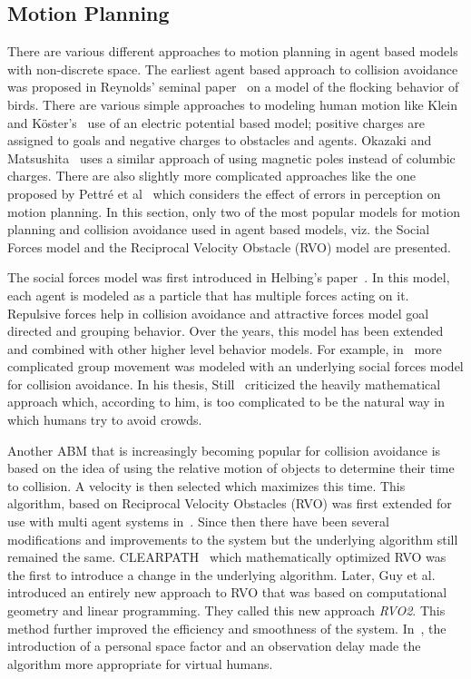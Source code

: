 \documentclass[runningheads,a4paper]{llncs}
\begin{document}
\subsection{Motion Planning}

There are various different approaches to motion planning in agent based models with non-discrete space. The earliest agent based approach to collision avoidance was proposed in Reynolds' seminal paper~\cite{Reynolds:1987vm} on a model of the flocking behavior of birds. There are various simple approaches to modeling human motion like Klein and K\"oster's~\cite{Klein:2009} use of an electric potential based model; positive charges are assigned to goals and negative charges to obstacles and agents. Okazaki and Matsushita~\cite{Okazaki:1993wh} uses a similar approach of using magnetic poles instead of columbic charges. There are also slightly more complicated approaches like the one proposed by Pettr\'e et al~\cite{Pettre:2009fya} which considers the effect of errors in perception on motion planning. In this section, only two of the most popular models for motion planning and collision avoidance used in agent based models, viz. the Social Forces model and the Reciprocal Velocity Obstacle (RVO) model are presented.

The social forces model was first introduced in Helbing's paper~\cite{Helbing:1995ie}. In this model, each agent is modeled as a particle that has multiple forces acting on it. Repulsive forces help in collision avoidance and attractive forces model goal directed and grouping behavior. Over the years, this model has been extended and combined with other higher level behavior models. For example, in~\cite{Kamphuis:2004uu} more complicated group movement was modeled with an underlying social forces model for collision avoidance. In his thesis, Still~\cite{Still:2000tp} criticized the heavily mathematical approach which, according to him, is too complicated to be the natural way in which humans try to avoid crowds.

Another ABM that is increasingly becoming popular for collision avoidance is based on the idea of using the relative motion of objects to determine their time to collision. A velocity is then selected which maximizes this time. This algorithm, based on Reciprocal Velocity Obstacles (RVO) was first extended for use with multi agent systems in~\cite{vandenBerg:2008cq}. Since then there have been several modifications and improvements to the system but the underlying algorithm still remained the same. CLEARPATH~\cite{Guy:2009gu} which mathematically optimized RVO was the first to introduce a change in the underlying algorithm. Later, Guy et al.~\cite{Guy:2010ko} introduced an entirely new approach to RVO that was based on computational geometry and linear programming. They called this new approach \emph{RVO2}. This method further improved the efficiency and smoothness of the system. In~\cite{Guy:2010te}, the introduction of a personal space factor and an observation delay made the algorithm more appropriate for virtual humans.
\end{document}
